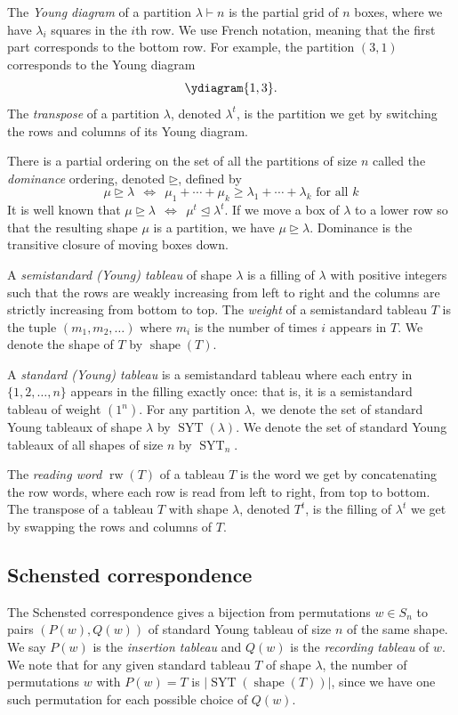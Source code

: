 \documentclass[ALCO, Unicode]{cedram}
\DeclareMathOperator{\syt}{SYT}
\DeclareMathOperator{\shape}{shape}
\DeclareMathOperator{\rw}{rw}
\begin{document}
The \textit{Young diagram} of a partition $\lambda\vdash n$ is the partial grid of $n$ boxes, where we have $\lambda_i$ squares in the $i$th row. 
We use French notation, meaning that the first part corresponds to the bottom row.  For example, the partition $(3,1)$ corresponds to the Young diagram \[\ydiagram{1,3}.\]
The \textit{transpose} of a partition $\lambda$, denoted $\lambda^t$, is the partition we get by switching the rows and columns of its Young diagram. 

There is a partial ordering on the set of all the partitions of size $n$ called the \textit{dominance} ordering, denoted $\unrhd$, defined by 
\[\mu\unrhd \lambda \ \  \Leftrightarrow \ \  \mu_1 + \cdots + \mu_k \geq \lambda_1+\cdots +  \lambda_k \text{ for all } k\]
It is well known that $\mu \unrhd \lambda \ \  \Leftrightarrow \ \   \mu^t \unlhd \lambda^t$. If we move a box of $\lambda$ to a lower row so that the resulting shape $\mu$ is a partition, we have $\mu \unrhd \lambda.$
Dominance is the transitive closure of moving boxes down. 

A \textit{semistandard (Young) tableau} of shape $\lambda$ is a filling of $\lambda$ with positive integers such that the rows are weakly increasing from left to right and the 
columns are strictly increasing from bottom to top. The \textit{weight} of a semistandard tableau $T$ is the tuple $(m_1, m_2,\dots)$  where $m_i$ is the number of times $i$ appears in $T$. We denote the shape of $T$ by $\shape(T)$.

A \textit{standard (Young) tableau} is a semistandard tableau where each entry in $\{1,2,\dots, n\}$ appears in the filling exactly once:  that is, it is a semistandard tableau of weight $(1^n)$. For any partition $\lambda, $ we denote the set of standard Young tableaux of shape $\lambda$ by $\syt(\lambda)$. We denote the set of standard Young tableaux of all shapes of size $n$ by $\syt_n$.

The \textit{reading word} $\rw(T)$ of a tableau $T$ is the word we get by concatenating the row words, where each row is read from left to right, from top to bottom. The transpose of a tableau $T$ with shape $\lambda$, denoted $T^t$, is the filling of $\lambda^t$ we get by swapping the rows and columns of $T$. 


\subsection{Schensted correspondence}\label{subsec:RSK}
The Schensted correspondence gives a bijection from permutations $w\in S_n$ to pairs $(P(w),Q(w))$ of standard Young tableau of size $n$ of the same shape. We say $P(w)$ is the \textit{insertion tableau} and $Q(w)$ is the \textit{recording tableau} of $w$.
We note that for any given standard tableau $T$ of shape $\lambda$, the number of permutations $w$ with $P(w) = T$ is $|\syt(\shape(T))|$, since we have one such permutation for each possible choice of $Q(w)$.
\end{document}
